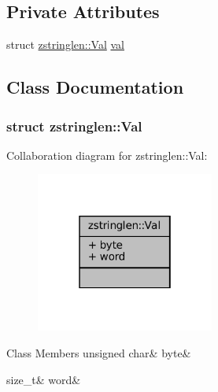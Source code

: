\subsection*{Private Attributes}
\begin{DoxyCompactItemize}
\item 
struct \mbox{\hyperlink{classzstringlen_structzstringlen_1_1_val}{zstringlen\+::\+Val}} \mbox{\hyperlink{classzstringlen_a15c3da1ffefe79eee45314c8380da81d}{val}}
\end{DoxyCompactItemize}


\subsection{Class Documentation}
\label{structzstringlen_1_1_val}
\subsubsection{struct zstringlen\+:\+:Val}


Collaboration diagram for zstringlen\+:\+:Val\+:
\nopagebreak
\begin{figure}[H]
\begin{center}
\leavevmode
\includegraphics[width=166pt]{structzstringlen_1_1_val__coll__graph}
\end{center}
\end{figure}
\begin{DoxyFields}{Class Members}
\mbox{\label{classzstringlen_aa8955aa8a003b2e53fe5954b5aec85d9}} 
unsigned char&
byte&
\\
\hline

\mbox{\label{classzstringlen_af3fef892050ce6c4fdffd80b8c83e0af}} 
size\_t&
word&
\\
\hline

\end{DoxyFields}


